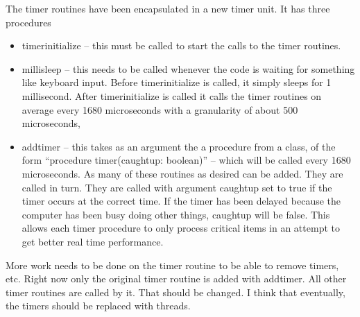 \documentclass[12pt]{article}
\begin{document}
The timer routines have been encapsulated in a new timer unit. It has
three procedures
\begin{itemize}
\item
timerinitialize -- this must be called to start the calls to the
timer routines.
\item
millisleep -- this needs to be called whenever the code is waiting for
something like keyboard input. Before timerinitialize is called, it
simply sleeps for 1 millisecond. After timerinitialize is
called it calls the timer routines on
average every 1680 microseconds with a granularity of about 500 microseconds,
\item
addtimer -- this takes as an argument the a procedure from a class, of the
form ``procedure timer(caughtup: boolean)'' -- which will be called
every 1680 microseconds. As many of these routines as desired can be added.
They are called in turn. They are called with argument caughtup set to true
if the timer occurs at the correct time. If the timer has been delayed
because the computer has been busy doing other things, caughtup will be
false. This allows each timer procedure to only process critical items
in an attempt to get better real time performance.
\end{itemize}

More work needs to be done on the timer routine to be able to remove
timers, etc. Right now only the original timer routine is added with addtimer.
All other timer routines are called by it. That should be changed.
I think that eventually, the timers should be replaced
with threads.
\end{document}
